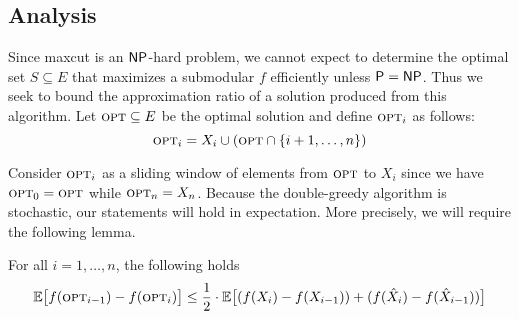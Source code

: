 \documentclass{article}
\begin{document}
\subsection{Analysis}

Since maxcut is an $\mathsf{NP}$-hard problem, we cannot expect to determine the optimal set $S \subseteq E$ that maximizes a submodular $f$ efficiently unless $\mathsf{P} = \mathsf{NP}$. Thus we seek to bound the approximation ratio of a solution produced from this algorithm. Let $\textup{\textsc{opt}} \subseteq E$ be the optimal solution and define $\textup{\textsc{opt}}_i$ as follows:
\begin{equation*}
\textup{\textsc{opt}}_i = X_i \cup (\textup{\textsc{opt}} \cap \{ i+1, \ldots, n \})
\end{equation*}

Consider $\textup{\textsc{opt}}_i$ as a sliding window of elements from $\textup{\textsc{opt}}$ to $X_i$ since we have $\textup{\textsc{opt}}_0 = \textup{\textsc{opt}}$ while $\textup{\textsc{opt}}_n = X_n$. Because the double-greedy algorithm is stochastic, our statements will hold in expectation. More precisely, we will require the following lemma.
\begin{lemma}\label{lem:big-boi}
For all $i = 1, \ldots, n$, the following holds
\begin{equation}\label{eqn:big-boi}
\mathbb{E} \big[ f(\textup{\textsc{opt}}_{i-1}) - f(\textup{\textsc{opt}}_i) \big]
\leq \frac{1}{2} \cdot \mathbb{E} \big[ (f(X_i) - f(X_{i-1})) + (f(\hat{X}_i) - f(\hat{X}_{i-1})) \big]
\end{equation}
\end{lemma}
\end{document}
